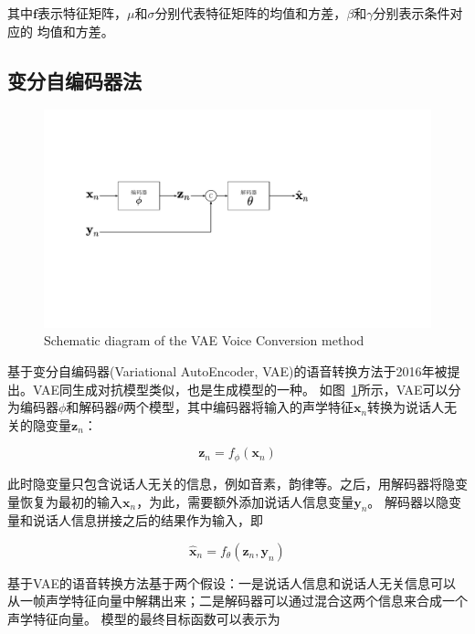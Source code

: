 其中$\mathbf{f}$表示特征矩阵，$\mu$和$\sigma$分别代表特征矩阵的均值和方差，$\beta$和$\gamma$分别表示条件对应的
均值和方差。

\subsection{变分自编码器法}

\begin{figure}[!htp]
    \centering
    \includegraphics[width=13cm,trim=30 170 170 130,clip]{figure/3_vae.pdf}
    {Schematic diagram of the VAE Voice Conversion method}
    \label{fig:vae}
\end{figure}

基于变分自编码器(Variational AutoEncoder, VAE)的语音转换方法于2016年被提出。VAE同生成对抗模型类似，也是生成模型的一种。
如图~\ref{fig:vae}所示，VAE可以分为编码器$\phi$和解码器$\theta$两个模型，其中编码器将输入的声学特征$\mathbf{x}_n$转换为说话人无关的隐变量$\mathbf{z}_n$：

\begin{equation}
    \mathbf{z}_n = f_{\phi}(\mathbf{x}_n)
\end{equation}

此时隐变量只包含说话人无关的信息，例如音素，韵律等。之后，用解码器将隐变量恢复为最初的输入$\mathbf{x}_n$，为此，需要额外添加说话人信息变量$\mathbf{y}_n$。
解码器以隐变量和说话人信息拼接之后的结果作为输入，即

\begin{equation}
    \hat{\mathbf{x}}_n = f_{\theta}(\mathbf{z}_n,\mathbf{y}_n)
\end{equation}

基于VAE的语音转换方法基于两个假设：一是说话人信息和说话人无关信息可以从一帧声学特征向量中解耦出来；二是解码器可以通过混合这两个信息来合成一个声学特征向量。
模型的最终目标函数可以表示为

